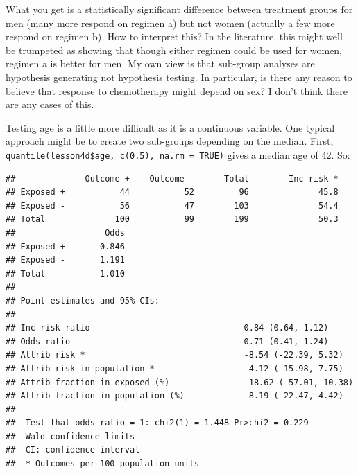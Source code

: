 \documentclass[]{book}
\newenvironment{Shaded}{\begin{snugshade}}{\end{snugshade}}
\newcommand{\CommentTok}[1]{\textcolor[rgb]{0.56,0.35,0.01}{\textit{#1}}}
\newcommand{\DataTypeTok}[1]{\textcolor[rgb]{0.13,0.29,0.53}{#1}}
\newcommand{\DecValTok}[1]{\textcolor[rgb]{0.00,0.00,0.81}{#1}}
\newcommand{\KeywordTok}[1]{\textcolor[rgb]{0.13,0.29,0.53}{\textbf{#1}}}
\newcommand{\NormalTok}[1]{#1}
\newcommand{\OperatorTok}[1]{\textcolor[rgb]{0.81,0.36,0.00}{\textbf{#1}}}
\newcommand{\StringTok}[1]{\textcolor[rgb]{0.31,0.60,0.02}{#1}}
\begin{document}
What you get is a statistically significant difference between treatment groups for men (many more respond on regimen a) but not women (actually a few more respond on regimen b). How to interpret this? In the literature, this might well be trumpeted as showing that though either regimen could be used for women, regimen a is better for men. My own view is that sub-group analyses are hypothesis generating not hypothesis testing. In particular, is there any reason to believe that response to chemotherapy might depend on sex? I don't think there are any cases of this.

Testing age is a little more difficult as it is a continuous variable. One typical approach might be to create two sub-groups depending on the median. First, \texttt{quantile(lesson4d\$age,\ c(0.5),\ na.rm\ =\ TRUE)} gives a median age of 42. So:

\begin{Shaded}
\end{Shaded}

\begin{verbatim}
##              Outcome +    Outcome -      Total        Inc risk *
## Exposed +           44           52         96              45.8
## Exposed -           56           47        103              54.4
## Total              100           99        199              50.3
##                  Odds
## Exposed +       0.846
## Exposed -       1.191
## Total           1.010
## 
## Point estimates and 95% CIs:
## -------------------------------------------------------------------
## Inc risk ratio                               0.84 (0.64, 1.12)
## Odds ratio                                   0.71 (0.41, 1.24)
## Attrib risk *                                -8.54 (-22.39, 5.32)
## Attrib risk in population *                  -4.12 (-15.98, 7.75)
## Attrib fraction in exposed (%)               -18.62 (-57.01, 10.38)
## Attrib fraction in population (%)            -8.19 (-22.47, 4.42)
## -------------------------------------------------------------------
##  Test that odds ratio = 1: chi2(1) = 1.448 Pr>chi2 = 0.229
##  Wald confidence limits
##  CI: confidence interval
##  * Outcomes per 100 population units
\end{verbatim}
\end{document}
